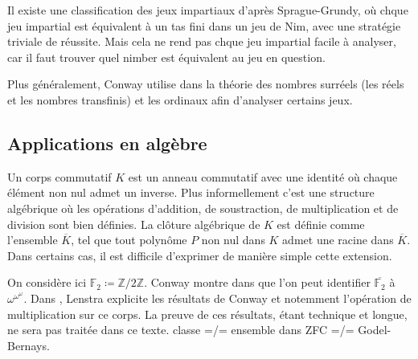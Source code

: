 \documentclass{article}
\theoremstyle{definition}
\theoremstyle{plain}
\theoremstyle{plain}
\theoremstyle{plain}
\theoremstyle{plain}
\theoremstyle{plain}
\begin{document}
Il existe une classification des jeux impartiaux d'après Sprague-Grundy, où chque jeu impartial est équivalent à un tas fini dans un jeu de Nim, avec une stratégie triviale de réussite. Mais cela ne rend pas chque jeu impartial facile à analyser, car il faut trouver quel nimber est équivalent au jeu en question. \cite{schleicher2005introduction}

Plus généralement, Conway utilise dans \cite{conway2000onag} la théorie des nombres surréels (les réels et les nombres transfinis) et les ordinaux afin d'analyser certains jeux. 

\subsection{Applications en algèbre}

\par Un corps commutatif \( K \) est un anneau commutatif avec une identité où chaque élément non nul admet un inverse. Plus informellement c'est une structure algébrique où les opérations d'addition, de soustraction, de multiplication et de division sont bien définies. La clôture algébrique de \( K \) est définie comme l'ensemble \( \overline{K} \), tel que tout polynôme \( P \) non nul dans \( K \) admet une racine dans \( \overline{K} \). Dans certains cas, il est difficile d'exprimer de manière simple cette extension.

\par On considère ici \( \mathbb{F}_{2} \coloneqq \mathbb{Z}/2\mathbb{Z} \). Conway montre dans \cite{conway2000onag} que l'on peut identifier \( \overline{\mathbb{F}_{2}} \) à \(\omega^{\omega^\omega} \). Dans \cite{lenstra1977algebraic}, Lenstra explicite les résultats de Conway et notemment l'opération de multiplication sur ce corps. La preuve de ces résultats, étant technique et longue, ne sera pas traitée dans ce texte.
classe =/= ensemble dans ZFC =/= Godel-Bernays.

\clearpage
\printbibliography[heading=bibintoc]
\end{document}
